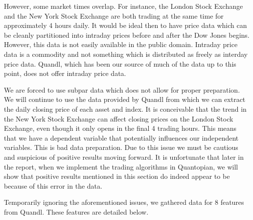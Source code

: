 \documentclass{report}
\begin{document}
However, some market times overlap. For instance, the London Stock Exchange and the New York Stock Exchange are both trading at the same time for approximately 4 hours daily. It would be ideal then to have price data which can be cleanly partitioned into intraday prices before and after the Dow Jones begins. However, this data is not easily available in the public domain. Intraday price data is a commodity and not something which is distributed as freely as interday price data. Quandl, which has been our source of much of the data up to this point, does not offer intraday price data.

We are forced to use subpar data which does not allow for proper preparation. We will continue to use the data provided by Quandl from which we can extract the daily closing price of each asset and index. It is conceivable that the trend in the New York Stock Exchange can affect closing prices on the London Stock Exchange, even though it only opens in the final 4 trading hours. This means that we have a dependent variable that potentially influences our independent variables. This is bad data preparation. Due to this issue we must be cautious and suspicious of positive results moving forward. It is unfortunate that later in the report, when we implement the trading algorithms in Quantopian, we will show that positive results mentioned in this section do indeed appear to be because of this error in the data.

Temporarily ignoring the aforementioned issues, we gathered data for 8 features from Quandl. These features are detailed below.
\end{document}
